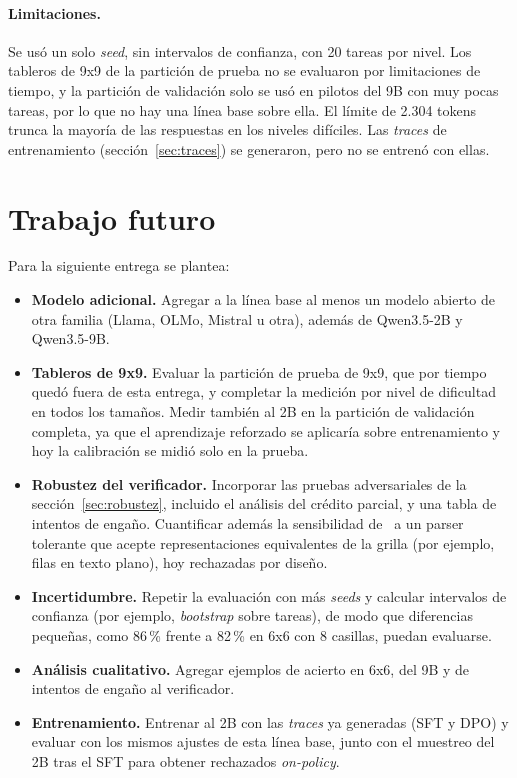 \paragraph{Limitaciones.}
Se usó un solo \emph{seed}, sin intervalos de confianza, con 20 tareas por nivel.
Los tableros de 9x9 de la partición de prueba no se evaluaron por limitaciones de
tiempo, y la partición de
validación solo se usó en pilotos del 9B con muy pocas tareas, por lo que no hay
una línea base sobre ella. El límite de 2.304 tokens trunca la mayoría de las
respuestas en los niveles difíciles. Las \emph{traces} de entrenamiento
(sección~\ref{sec:traces}) se generaron, pero no se entrenó con ellas.


\section{Trabajo futuro}
\label{sec:futuro}

Para la siguiente entrega se plantea:
\begin{itemize}
  \item \textbf{Modelo adicional.} Agregar a la línea base al menos un modelo
  abierto de otra familia (Llama, OLMo, Mistral u otra), además de Qwen3.5-2B y
  Qwen3.5-9B.
  \item \textbf{Tableros de 9x9.} Evaluar la partición de prueba de 9x9, que por
  tiempo quedó fuera de esta entrega, y completar la medición por nivel de
  dificultad en todos los tamaños. Medir también al 2B en la partición de
  validación completa, ya que el aprendizaje reforzado se aplicaría sobre
  entrenamiento y hoy la calibración se midió solo en la prueba.
  \item \textbf{Robustez del verificador.} Incorporar las pruebas adversariales
  de la sección~\ref{sec:robustez}, incluido el análisis del crédito parcial, y
  una tabla de intentos de engaño. Cuantificar además la sensibilidad de
  \passuno\ a un parser tolerante que acepte representaciones equivalentes de la
  grilla (por ejemplo, filas en texto plano), hoy rechazadas por diseño.
  \item \textbf{Incertidumbre.} Repetir la evaluación con más \emph{seeds} y
  calcular intervalos de confianza (por ejemplo, \emph{bootstrap} sobre tareas),
  de modo que diferencias pequeñas, como 86\,\% frente a 82\,\% en 6x6 con 8
  casillas, puedan evaluarse.
  \item \textbf{Análisis cualitativo.} Agregar ejemplos de acierto en 6x6, del
  9B y de intentos de engaño al verificador.
  \item \textbf{Entrenamiento.} Entrenar al 2B con las \emph{traces} ya generadas
  (SFT y DPO) y evaluar con los mismos ajustes de esta línea base, junto con el
  muestreo del 2B tras el SFT para obtener rechazados \emph{on-policy}.
\end{itemize}
